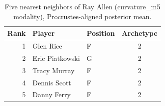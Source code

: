 \begin{table}[htbp]
  \centering\small
  \begin{tabular}{rllc}
    \toprule
    Rank & Player & Position & Archetype \\
    \midrule
    1 & Glen Rice & F & 2 \\
    2 & Eric Piatkowski & G & 2 \\
    3 & Tracy Murray & F & 2 \\
    4 & Dennis Scott & F & 2 \\
    5 & Danny Ferry & F & 2 \\
    \bottomrule
  \end{tabular}
  \caption{Five nearest neighbors of Ray Allen (curvature_m5 modality), Procrustes-aligned posterior mean.}
  \label{tab:Ray_Allen_neighbors_curvature_m5}
\end{table}

